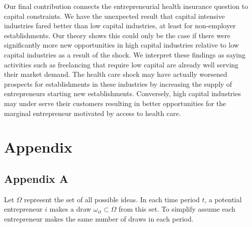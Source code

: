 \documentclass[12pt]{article}
\begin{document}
Our final contribution connects the entrepreneurial health insurance question to capital constraints. We have the unexpected result that capital intensive industries fared better than low capital industries, at least for non-employer establishments. Our theory shows this could only be the case if there were significantly more new opportunities in high capital industries relative to low capital industries as a result of the shock. We interpret these findings as saying activities such as freelancing that require low capital are already well serving their market demand. The health care shock may have actually worsened prospects for establishments in these industries by increasing the supply of entrepreneurs starting new establishments. Conversely, high capital industries may under serve their customers resulting in better opportunities for the marginal entrepreneur motivated by access to health care. 


\begin{comment}

Our results point the way to future research in this area. Our results may be sensitive to for example the subsidy schedule based on income implemented in Massachusetts. In addition, more precise firm creation data sources may allow us to make stronger statements about the types of industries that benefited from health care reform.


Reasons why no result is plausible: 
People will do this anyway
Cost of insurance is not covered; still expensive. 
People disuaded small sub-sample of entrepreneurs, pre-existing conditions or those with kids but no spousal insurance or access to VC funds

However 
Long and Dahlen \footnote{Long Dahlen 2014} and Long, Stockly and Nordahl \footnote{2012} show insurance rates increased primarily among low income, childless adults. Not the demographic for entrepreneurs. 

\end{comment}

\newpage

\appendix
\section*{Appendix}
\subsection*{Appendix A}

Let $\Omega$ represent the set of all possible ideas. In each time period $t$, a potential entrepreneur $i$ makes a draw $\omega_{it} \subset \Omega$ from this set. To simplify assume each entrepreneur makes the same number of draws in each period. 
\end{document}
